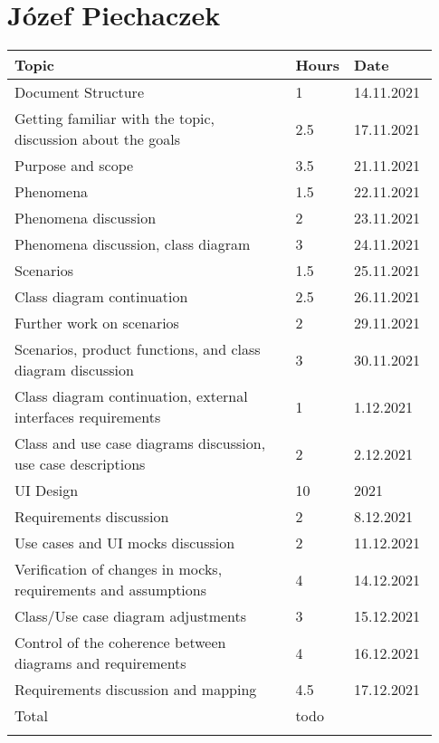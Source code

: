 \section*{Józef Piechaczek}
\begin{longtable}{@{}p{0.67\linewidth} p{0.06\linewidth} p{0.20\linewidth}@{}}
    \Xhline{1.5pt}
    Topic &  Hours & Date \\ \hline
    Document Structure & 1 & 14.11.2021 \\ 
    Getting familiar with the topic, discussion about the goals & 2.5 & 17.11.2021 \\ 
    Purpose and scope & 3.5 & 21.11.2021 \\ 
    Phenomena & 1.5 & 22.11.2021 \\ 
    Phenomena discussion & 2 & 23.11.2021 \\
    Phenomena discussion, class diagram & 3 & 24.11.2021 \\ 
    Scenarios & 1.5 & 25.11.2021 \\
    Class diagram continuation & 2.5 & 26.11.2021 \\ 
    Further work on scenarios & 2 & 29.11.2021 \\
    Scenarios, product functions, and class diagram discussion & 3 & 30.11.2021\\ 
    Class diagram continuation, external interfaces requirements & 1 & 1.12.2021\\
    Class and use case diagrams discussion, use case descriptions & 2 & 2.12.2021\\
    UI Design & 10 & 2021\\ 
    Requirements discussion & 2 & 8.12.2021\\
    Use cases and UI mocks discussion & 2 & 11.12.2021\\
    Verification of changes in mocks, requirements and assumptions & 4 & 14.12.2021\\
    Class/Use case diagram adjustments & 3 & 15.12.2021\\
    Control of the coherence between diagrams and requirements & 4 & 16.12.2021\\
    Requirements discussion and mapping & 4.5 & 17.12.2021\\
    \hline
    Total &  todo & \\ \Xhline{1.5pt}
\end{longtable}

